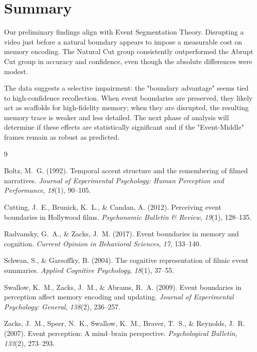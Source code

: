 \documentclass[11pt, a4paper]{article}
\begin{document}
\section{Summary}

Our preliminary findings align with Event Segmentation Theory. Disrupting a video just before a natural boundary appears to impose a measurable cost on memory encoding. The Natural Cut group consistently outperformed the Abrupt Cut group in accuracy and confidence, even though the absolute differences were modest.

The data suggests a selective impairment: the "boundary advantage" seems tied to high-confidence recollection. When event boundaries are preserved, they likely act as scaffolds for high-fidelity memory; when they are disrupted, the resulting memory trace is weaker and less detailed. The next phase of analysis will determine if these effects are statistically significant and if the "Event-Middle" frames remain as robust as predicted.


\begin{thebibliography}{9}

Boltz, M.~G. (1992). Temporal accent structure and the remembering of filmed
narratives. \textit{Journal of Experimental Psychology: Human Perception and
Performance}, \textit{18}(1), 90--105.

Cutting, J.~E., Brunick, K.~L., \& Candan, A. (2012). Perceiving event
boundaries in Hollywood films. \textit{Psychonomic Bulletin \& Review},
\textit{19}(1), 128--135.

Radvansky, G.~A., \& Zacks, J.~M. (2017). Event boundaries in memory and
cognition. \textit{Current Opinion in Behavioral Sciences}, \textit{17}, 133--140.

Schwan, S., \& Garsoffky, B. (2004). The cognitive representation of filmic
event summaries. \textit{Applied Cognitive Psychology}, \textit{18}(1), 37--55.

Swallow, K.~M., Zacks, J.~M., \& Abrams, R.~A. (2009). Event boundaries in
perception affect memory encoding and updating. \textit{Journal of Experimental
Psychology: General}, \textit{138}(2), 236--257.

Zacks, J.~M., Speer, N.~K., Swallow, K.~M., Braver, T.~S., \& Reynolds,
J.~R. (2007). Event perception: A mind--brain perspective. \textit{Psychological
Bulletin}, \textit{133}(2), 273--293.

\end{thebibliography}
\end{document}
